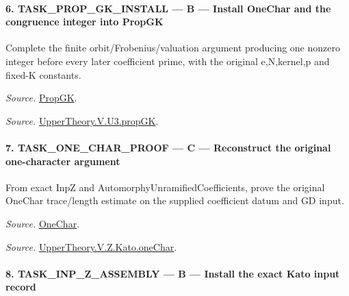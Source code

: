 \paragraph{6. TASK\_\allowbreak PROP\_\allowbreak GK\_\allowbreak INSTALL — B — Install OneChar and the congruence integer into PropGK}

Complete the finite orbit/Frobenius/valuation argument producing one nonzero integer before every later coefficient prime, with the original e,N,kernel,p and fixed-K constants.

\emph{Source.} \href{https://github.com/CocoSgt/riemann-hypothesis-lean/blob/7cbf7a0c32fca1badf05931879a37c3f8a2b03b4/src/Development/AutomorphicArithmetic/AutomorphicVarieties/UnitaryThreeGroups/KatoUse.lean#L36-L42}{PropGK}.

\emph{Source.} \href{https://github.com/CocoSgt/riemann-hypothesis-lean/blob/7cbf7a0c32fca1badf05931879a37c3f8a2b03b4/src/Development/AutomorphicArithmetic/AutomorphicVarieties/UnitaryThreeGroups/OrbEquiv.lean#L111-L173}{UpperTheory.V.U3.propGK}.



\paragraph{7. TASK\_\allowbreak ONE\_\allowbreak CHAR\_\allowbreak PROOF — C — Reconstruct the original one-character argument}

From exact InpZ and AutomorphyUnramifiedCoefficients, prove the original OneChar trace/length estimate on the supplied coefficient datum and GD input.

\emph{Source.} \href{https://github.com/CocoSgt/riemann-hypothesis-lean/blob/7cbf7a0c32fca1badf05931879a37c3f8a2b03b4/src/Development/AutomorphicArithmetic/AutomorphicVarieties/UnitaryThreeGroups/KatoUse.lean#L54-L64}{OneChar}.

\emph{Source.} \href{https://github.com/CocoSgt/riemann-hypothesis-lean/blob/7cbf7a0c32fca1badf05931879a37c3f8a2b03b4/src/Development/AutomorphicArithmetic/AutomorphicVarieties/ModularityArgument/KatoQuadraticCharacters/OneChar.lean#L158-L178}{UpperTheory.V.Z.Kato.oneChar}.



\paragraph{8. TASK\_\allowbreak INP\_\allowbreak Z\_\allowbreak ASSEMBLY — B — Install the exact Kato input record}

